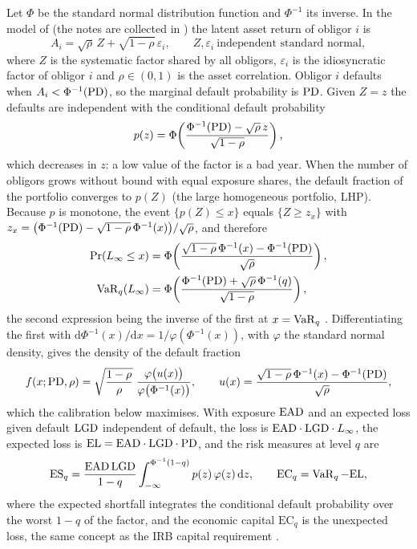 Let $\Phi$ be the standard normal distribution function and $\Phi^{-1}$ its inverse. In the model of
\citet{ratings:vasicek2002} (the notes are collected in \citealp{credit-capital:vasicek1987,ratings:vasicek1991}) the
latent asset return of obligor $i$ is
\begin{equation}
A_i=\sqrt{\rho}\,Z+\sqrt{1-\rho}\,\varepsilon_i,\qquad Z,\varepsilon_i\ \text{independent standard normal},
\label{eq:cc-asset}
\end{equation}
where $Z$ is the systematic factor shared by all obligors, $\varepsilon_i$ is the idiosyncratic factor of obligor $i$ and $\rho\in(0,1)$
is the asset correlation. Obligor $i$ defaults when $A_i<\Phi^{-1}(\mathrm{PD})$, so the marginal default probability is $\mathrm{PD}$. Given $Z=z$ the
defaults are independent with the conditional default probability
\begin{equation}
p(z)=\Phi\!\left(\frac{\Phi^{-1}(\mathrm{PD})-\sqrt{\rho}\,z}{\sqrt{1-\rho}}\right),
\label{eq:cc-condpd}
\end{equation}
which decreases in $z$: a low value of the factor is a bad year. When the number of obligors grows without bound with equal exposure
shares, the default fraction of the portfolio converges to $p(Z)$ (the large homogeneous portfolio, LHP). Because $p$ is monotone, the
event $\{p(Z)\le x\}$ equals $\{Z\ge z_x\}$ with $z_x=\big(\Phi^{-1}(\mathrm{PD})-\sqrt{1-\rho}\,\Phi^{-1}(x)\big)/\sqrt{\rho}$, and therefore
\begin{equation}
\begin{aligned}
\Pr(L_\infty\le x)&=\Phi\!\left(\frac{\sqrt{1-\rho}\,\Phi^{-1}(x)-\Phi^{-1}(\mathrm{PD})}{\sqrt{\rho}}\right),\\
\operatorname{VaR}_q(L_\infty)&=\Phi\!\left(\frac{\Phi^{-1}(\mathrm{PD})+\sqrt{\rho}\,\Phi^{-1}(q)}{\sqrt{1-\rho}}\right),
\end{aligned}
\label{eq:cc-lhp}
\end{equation}
the second expression being the inverse of the first at $x=\operatorname{VaR}_q$ \citep{ratings:vasicek2002}. Differentiating the first with
$\mathrm{d}\Phi^{-1}(x)/\mathrm{d}x=1/\varphi(\Phi^{-1}(x))$, with $\varphi$ the standard normal density, gives the density of the default
fraction
\begin{equation}
f(x;\mathrm{PD},\rho)=\sqrt{\frac{1-\rho}{\rho}}\;\frac{\varphi\big(u(x)\big)}{\varphi\big(\Phi^{-1}(x)\big)},\qquad
u(x)=\frac{\sqrt{1-\rho}\,\Phi^{-1}(x)-\Phi^{-1}(\mathrm{PD})}{\sqrt{\rho}},
\label{eq:cc-density}
\end{equation}
which the calibration below maximises. With exposure $\mathrm{EAD}$ and an expected loss given default $\mathrm{LGD}$ independent of default, the loss
is $\mathrm{EAD}\cdot\mathrm{LGD}\cdot L_\infty$, the expected loss is $\mathrm{EL}=\mathrm{EAD}\cdot\mathrm{LGD}\cdot\mathrm{PD}$, and the risk measures at level $q$ are
\begin{equation}
\operatorname{ES}_q=\frac{\mathrm{EAD}\,\mathrm{LGD}}{1-q}\int_{-\infty}^{\Phi^{-1}(1-q)}p(z)\,\varphi(z)\,\mathrm{d} z,\qquad
\mathrm{EC}_q=\operatorname{VaR}_q-\mathrm{EL},
\label{eq:cc-es}
\end{equation}
where the expected shortfall integrates the conditional default probability over the worst $1-q$ of the factor, and the economic
capital $\mathrm{EC}_q$ is the unexpected loss, the same concept as the IRB capital requirement
\citep{ratings:bcbs2005,credit-capital:acerbitasche2002}.


